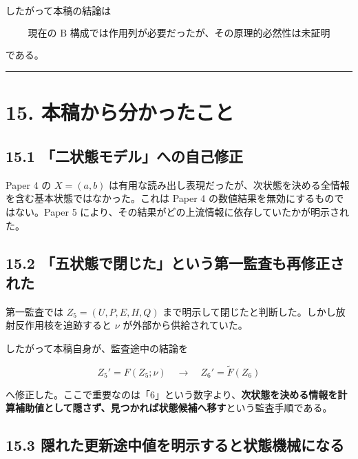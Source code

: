 \documentclass[
  a4paper,
]{ltjsarticle}
\begin{document}
したがって本稿の結論は

\[
\boxed{
\text{現在の B 構成では作用列が必要だったが、その原理的必然性は未証明}
}
\]

である。

\begin{center}\rule{0.5\linewidth}{0.5pt}\end{center}

\section{15.
本稿から分かったこと}\label{ux672cux7a3fux304bux3089ux5206ux304bux3063ux305fux3053ux3068}

\subsection{15.1
「二状態モデル」への自己修正}\label{ux4e8cux72b6ux614bux30e2ux30c7ux30ebux3078ux306eux81eaux5df1ux4feeux6b63}

Paper 4 の \(X=(a,b)\)
は有用な読み出し表現だったが、次状態を決める全情報を含む基本状態ではなかった。これは
Paper 4 の数値結果を無効にするものではない。Paper 5
により、その結果がどの上流情報に依存していたかが明示された。

\subsection{15.2
「五状態で閉じた」という第一監査も再修正された}\label{ux4e94ux72b6ux614bux3067ux9589ux3058ux305fux3068ux3044ux3046ux7b2cux4e00ux76e3ux67fbux3082ux518dux4feeux6b63ux3055ux308cux305f}

第一監査では \(Z_5=(U,P,E,H,Q)\)
まで明示して閉じたと判断した。しかし放射反作用核を追跡すると \(\nu\)
が外部から供給されていた。

したがって本稿自身が、監査途中の結論を

\[
\boxed{
Z_5'=F(Z_5;\nu)
\quad\longrightarrow\quad
Z_6'=\widetilde F(Z_6)
}
\]

へ修正した。ここで重要なのは「6」という数字より、\textbf{次状態を決める情報を計算補助値として隠さず、見つかれば状態候補へ移す}という監査手順である。

\subsection{15.3
隠れた更新途中値を明示すると状態機械になる}\label{ux96a0ux308cux305fux66f4ux65b0ux9014ux4e2dux5024ux3092ux660eux793aux3059ux308bux3068ux72b6ux614bux6a5fux68b0ux306bux306aux308b}
\end{document}
